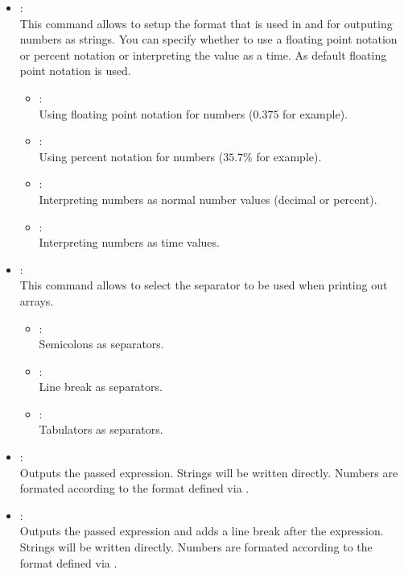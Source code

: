 \begin{itemize}

\item
{}:\\
This command allows to setup the format that is used in  and 
for outputing numbers as strings. You can specify whether to use a floating point notation or percent notation or interpreting
the value as a time. As default floating point notation is used.

\begin{itemize}
\item
{}:\\
Using floating point notation for numbers ($0.375$ for example).
\item
{}:\\
Using percent notation for numbers ($35.7\%$ for example).
\item
{}:\\
Interpreting numbers as normal number values (decimal or percent).
\item
{}:\\
Interpreting numbers as time values.
\end{itemize}

\item
{}:\\
This command allows to select the separator to be used when printing out arrays.
\begin{itemize}

\item
{}:\\
Semicolons as separators.

\item
{}:\\
Line break as separators.

\item
{}:\\
Tabulators as separators.
\end{itemize}

\item
{}:\\
Outputs the passed expression.
Strings will be written directly. Numbers are formated according to the format
defined via .

\item
{}:\\
Outputs the passed expression and adds a line break after the expression.
Strings will be written directly. Numbers are formated according to the format
defined via .


\end{itemize}
